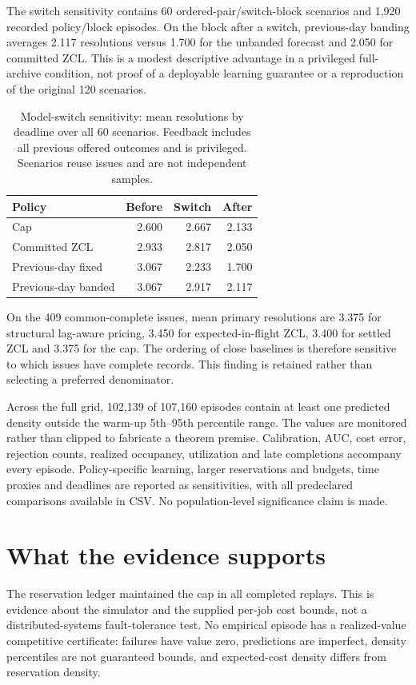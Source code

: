 \documentclass[11pt]{article}
\begin{document}
The switch sensitivity contains 60 ordered-pair/switch-block scenarios and 1,920 recorded policy/block episodes. On the block after a switch, previous-day banding averages 2.117 resolutions versus 1.700 for the unbanded forecast and 2.050 for committed ZCL. This is a modest descriptive advantage in a privileged full-archive condition, not proof of a deployable learning guarantee or a reproduction of the original 120 scenarios.
\begin{table}[tbp]\centering\small
\caption{Model-switch sensitivity: mean resolutions by deadline over all 60 scenarios. Feedback includes all previous offered outcomes and is privileged. Scenarios reuse issues and are not independent samples.}\label{tab:switch}
\begin{tabular}{lrrr}
\toprule
Policy & Before & Switch & After \\ \midrule
Cap & 2.600 & 2.667 & 2.133 \\
Committed ZCL & 2.933 & 2.817 & 2.050 \\
Previous-day fixed & 3.067 & 2.233 & 1.700 \\
Previous-day banded & 3.067 & 2.917 & 2.117 \\
\bottomrule\end{tabular}\end{table}
On the 409 common-complete issues, mean primary resolutions are 3.375 for structural lag-aware pricing, 3.450 for expected-in-flight ZCL, 3.400 for settled ZCL and 3.375 for the cap. The ordering of close baselines is therefore sensitive to which issues have complete records. This finding is retained rather than selecting a preferred denominator.

Across the full grid, 102,139 of 107,160 episodes contain at least one predicted density outside the warm-up 5th--95th percentile range. The values are monitored rather than clipped to fabricate a theorem premise. Calibration, AUC, cost error, rejection counts, realized occupancy, utilization and late completions accompany every episode. Policy-specific learning, larger reservations and budgets, time proxies and deadlines are reported as sensitivities, with all predeclared comparisons available in CSV. No population-level significance claim is made.

\section{What the evidence supports}
The reservation ledger maintained the cap in all completed replays. This is evidence about the simulator and the supplied per-job cost bounds, not a distributed-systems fault-tolerance test. No empirical episode has a realized-value competitive certificate: failures have value zero, predictions are imperfect, density percentiles are not guaranteed bounds, and expected-cost density differs from reservation density.
\end{document}
